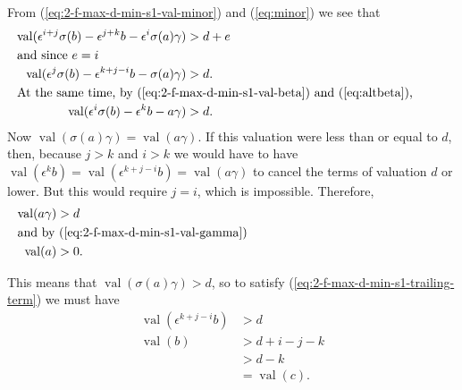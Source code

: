 \documentclass{amsart}
\theoremstyle{definition}
\def\e{\epsilon}
\def\val{\mathop{\mathrm{val}}}
\def\s{\sigma}
\begin{document}
  From (\ref{eq:2-f-max-d-min-s1-val-minor}) and (\ref{eq:minor}) we see that
  \begin{align}
    \val(\e^{i+j}\s(b) - \e^{j+k}b - \e^i\s(a)\gamma) &> d + e \nonumber\\
    \noalign{\noindent and since $e = i$}
    \label{eq:2-f-max-d-min-s1-trailing-term}
    \val(\e^j\s(b) - \e^{k+j-i}b - \s(a)\gamma) &> d. \\
    \noalign{\noindent At the same time, by (\ref{eq:2-f-max-d-min-s1-val-beta}) and
    (\ref{eq:altbeta}),}
    \val(\e^i\s(b) - \e^k b - a\gamma) &> d. \nonumber
  \end{align}
  Now $\val(\s(a)\gamma) = \val(a\gamma)$.  If this valuation were less than or
  equal to $d$, then, because $j > k$ and $i > k$ we would have to have
  $\val(\e^k b) = \val(\e^{k + j - i}b) = \val(a\gamma)$ to cancel the terms of
  valuation $d$ or lower.  But this would require $j = i$, which is
  impossible.  Therefore,
  \begin{align}
    \val(a\gamma) &> d \nonumber \\
    \noalign{\noindent and by (\ref{eq:2-f-max-d-min-s1-val-gamma})}
    \label{eq:2-f-max-d-min-s1-val-a}
    \val(a) &> 0.
  \end{align}

  This means that $\val(\s(a)\gamma) > d$, so to satisfy
  (\ref{eq:2-f-max-d-min-s1-trailing-term}) we must have
  \begin{align}
    \val(\e^{k + j - i} b) &> d \nonumber \\
    \val(b) &> d + i - j - k \nonumber \\
            &> d - k \nonumber  \\
            &= \val(c).
   \end{align}
\end{document}
